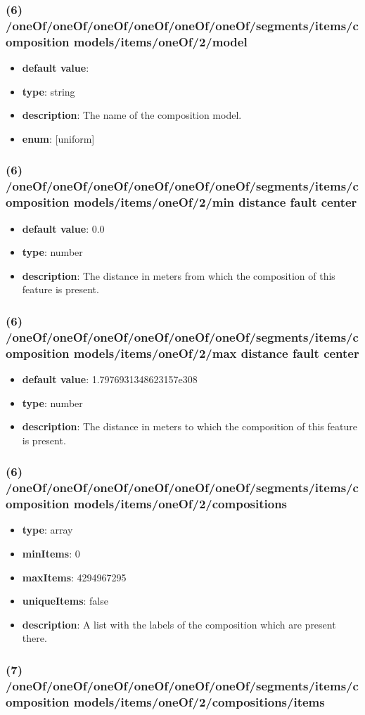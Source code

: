 \subsubsection{(6) /oneOf/oneOf/oneOf/oneOf/oneOf/oneOf/segments/items/composition models/items/oneOf/2/model}
\begin{itemize}[leftmargin=6em]\item {\bf default value}: 
\item {\bf type}: string
\item {\bf description}: The name of the composition model.
\item {\bf enum}: [uniform]\end{itemize}\subsubsection{(6) /oneOf/oneOf/oneOf/oneOf/oneOf/oneOf/segments/items/composition models/items/oneOf/2/min distance fault center}
\begin{itemize}[leftmargin=6em]\item {\bf default value}: 0.0
\item {\bf type}: number
\item {\bf description}: The distance in meters from which the composition of this feature is present.
\end{itemize}\subsubsection{(6) /oneOf/oneOf/oneOf/oneOf/oneOf/oneOf/segments/items/composition models/items/oneOf/2/max distance fault center}
\begin{itemize}[leftmargin=6em]\item {\bf default value}: 1.7976931348623157e308
\item {\bf type}: number
\item {\bf description}: The distance in meters to which the composition of this feature is present.
\end{itemize}\subsubsection{(6) /oneOf/oneOf/oneOf/oneOf/oneOf/oneOf/segments/items/composition models/items/oneOf/2/compositions}
\begin{itemize}[leftmargin=6em]\item {\bf type}: array
\item {\bf minItems}: 0
\item {\bf maxItems}: 4294967295
\item {\bf uniqueItems}: false
\item {\bf description}: A list with the labels of the composition which are present there.
\end{itemize}\subsubsection{(7) /oneOf/oneOf/oneOf/oneOf/oneOf/oneOf/segments/items/composition models/items/oneOf/2/compositions/items}
